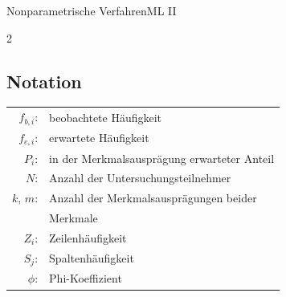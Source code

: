 \begin{formulaBox}{Nonparametrische Verfahren}{ML II}
\begin{multicols}{2}
\subsection*{Notation}
\begin{tabular}{rl}
    $f_{b,i}$:&beobachtete Häufigkeit\\
    $f_{e,i}$:&erwartete Häufigkeit \\
    $P_i$: &in der Merkmalsausprägung erwarteter Anteil\\
    $N$: &Anzahl der Untersuchungsteilnehmer\\
    $k$, $m$: &Anzahl der Merkmalsausprägungen beider\\ 
    &Merkmale\\
    $Z_i$: &Zeilenhäufigkeit \\
    $S_j$: &Spaltenhäufigkeit \\
    $\phi$: &Phi-Koeffizient\\
 \end{tabular}
 
\end{multicols}
\end{formulaBox}

